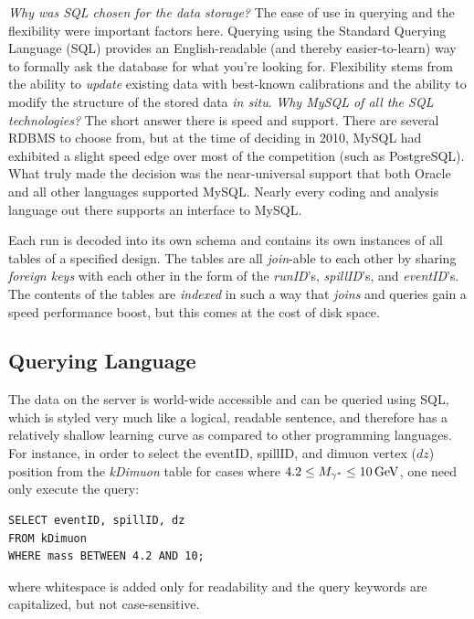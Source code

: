 \emph{Why was SQL chosen for the data storage?} The ease of use in querying and the flexibility were important factors here. Querying using the Standard Querying Language (SQL) provides an English-readable (and thereby easier-to-learn) way to formally ask the database for what you're looking for. Flexibility stems from the ability to \emph{update} existing data with best-known calibrations and the ability to modify the structure of the stored data \emph{in situ}. \emph{Why MySQL of all the SQL technologies?} The short answer there is speed and support. There are several RDBMS to choose from, but at the time of deciding in 2010, MySQL had exhibited a slight speed edge over most of the competition (such as PostgreSQL). What truly made the decision was the near-universal support that both Oracle and all other languages supported MySQL. Nearly every coding and analysis language out there supports an interface to MySQL.

Each run is decoded into its own schema and contains its own instances of all tables of a specified design. The tables are all \emph{join}-able to each other by sharing \emph{foreign keys} with each other in the form of the \emph{runID}'s, \emph{spillID}'s, and \emph{eventID}'s. The contents of the tables are \emph{indexed} in such a way that \emph{joins} and queries gain a speed performance boost, but this comes at the cost of disk space.

\subsection{Querying Language}

The data on the server is world-wide accessible and can be queried using SQL, which is styled very much like a logical, readable sentence, and therefore has a relatively shallow learning curve as compared to other programming languages. For instance, in order to select the eventID, spillID, and dimuon vertex ($dz$) position from the \emph{kDimuon} table for cases where $4.2 \leq M_{\gamma^*} \leq \unit[10]{GeV}$, one need only execute the query:
\begin{lstlisting}
SELECT eventID, spillID, dz
FROM kDimuon
WHERE mass BETWEEN 4.2 AND 10;
\end{lstlisting}
where whitespace is added only for readability and the query keywords are capitalized, but not case-sensitive.

